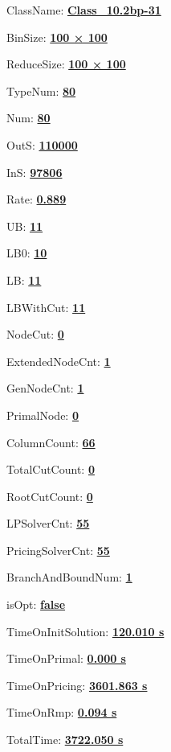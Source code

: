 \documentclass[11pt]{article}
\begin{document}
\pagestyle{empty}


ClassName: \underline{\textbf{Class_10.2bp-31}}
\par
BinSize: \underline{\textbf{100 × 100}}
\par
ReduceSize: \underline{\textbf{100 × 100}}
\par
TypeNum: \underline{\textbf{80}}
\par
Num: \underline{\textbf{80}}
\par
OutS: \underline{\textbf{110000}}
\par
InS: \underline{\textbf{97806}}
\par
Rate: \underline{\textbf{0.889}}
\par
UB: \underline{\textbf{11}}
\par
LB0: \underline{\textbf{10}}
\par
LB: \underline{\textbf{11}}
\par
LBWithCut: \underline{\textbf{11}}
\par
NodeCut: \underline{\textbf{0}}
\par
ExtendedNodeCnt: \underline{\textbf{1}}
\par
GenNodeCnt: \underline{\textbf{1}}
\par
PrimalNode: \underline{\textbf{0}}
\par
ColumnCount: \underline{\textbf{66}}
\par
TotalCutCount: \underline{\textbf{0}}
\par
RootCutCount: \underline{\textbf{0}}
\par
LPSolverCnt: \underline{\textbf{55}}
\par
PricingSolverCnt: \underline{\textbf{55}}
\par
BranchAndBoundNum: \underline{\textbf{1}}
\par
isOpt: \underline{\textbf{false}}
\par
TimeOnInitSolution: \underline{\textbf{120.010 s}}
\par
TimeOnPrimal: \underline{\textbf{0.000 s}}
\par
TimeOnPricing: \underline{\textbf{3601.863 s}}
\par
TimeOnRmp: \underline{\textbf{0.094 s}}
\par
TotalTime: \underline{\textbf{3722.050 s}}
\par
\newpage


\end{document}
